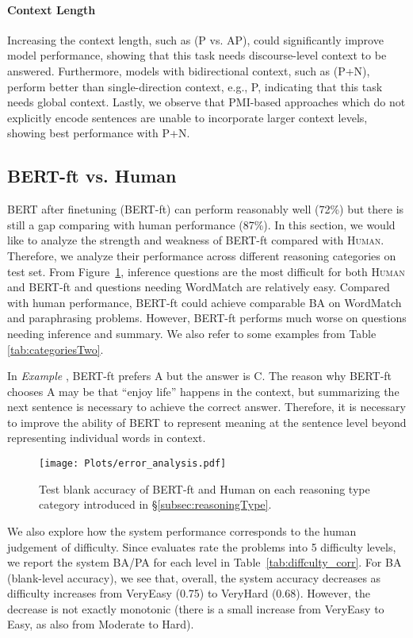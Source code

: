 \documentclass[11pt,a4paper]{article}
\begin{document}
\paragraph{Context Length} Increasing the context length, such as (P vs. AP), could significantly improve model performance, showing that this task needs discourse-level context to be answered. Furthermore, models with bidirectional context, such as (P+N), perform better than single-direction context, e.g., P, indicating that this task needs global context. Lastly, we observe that PMI-based approaches which do not explicitly encode sentences are unable to incorporate larger context levels, showing best performance with \textsc{P+N}.


\subsection{BERT-ft vs. Human}

BERT after finetuning (BERT-ft) can perform reasonably well (72\%) but there is still a gap comparing with human performance (87\%). In this section, we would like to analyze the strength and weakness of BERT-ft compared with \textsc{Human}. Therefore,
we analyze their performance across different reasoning categories on test set. From Figure~\ref{fig:error}, inference questions are the most difficult for both \textsc{Human} and BERT-ft and questions needing WordMatch are relatively easy.
Compared with human performance, BERT-ft could achieve comparable BA on WordMatch and paraphrasing problems. However, BERT-ft performs much worse on questions needing inference and summary. 
We also refer to some examples from Table \ref{tab:categoriesTwo}. 

In \emph{Example }, BERT-ft prefers A but the answer is C. The reason why BERT-ft chooses A may be that ``enjoy life'' happens in the context, but summarizing the next sentence is necessary to achieve the correct answer. Therefore, it is necessary to improve the ability of BERT to represent meaning at the sentence level beyond representing individual words in context.  
\begin{figure}
    \centering
    \texttt{[image: Plots/error\_analysis.pdf]}
    \caption{Test blank accuracy of BERT-ft and Human on each reasoning type category introduced in \S \ref{subsec:reasoningType}.}
    \label{fig:error}
\end{figure}

We also explore how the system performance corresponds to the human judgement of difficulty. Since evaluates rate the problems into 5 difficulty levels, we report the system BA/PA for each level in Table~\ref{tab:diffculty_corr}. For BA (blank-level accuracy), we see that, overall, the system accuracy decreases as difficulty increases from VeryEasy (0.75) to VeryHard (0.68). However, the decrease is not exactly monotonic (there is a small increase from VeryEasy to Easy, as also from Moderate to Hard). 
\end{document}
